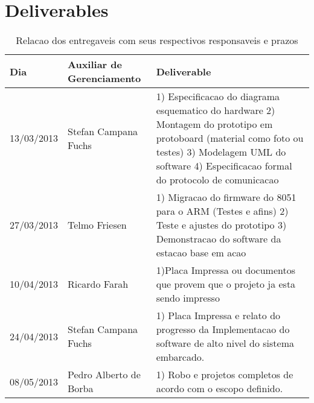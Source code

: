 \chapter{Deliverables}

\begin{table}[!h]
  \centering
  \caption{Relacao dos entregaveis com seus respectivos responsaveis e prazos}
    \begin{tabular}{|p{3cm}|p{4cm}||p{6cm}|}
    \toprule
    Dia   & Auxiliar de Gerenciamento & Deliverable \\
    \midrule
    13/03/2013 & Stefan Campana Fuchs & 1) Especificacao do diagrama esquematico do hardware
2) Montagem do prototipo em protoboard (material como foto ou testes)
3) Modelagem UML do software
4) Especificacao formal do protocolo de comunicacao  \\
    27/03/2013 & Telmo Friesen & 1) Migracao do firmware do 8051 para o ARM (Testes e afins)
2) Teste e ajustes do prototipo
3) Demonstracao do software da estacao base em acao  \\
    10/04/2013 & Ricardo Farah & 1)Placa Impressa ou documentos que provem que o projeto ja esta sendo impresso \\
    24/04/2013 & Stefan Campana Fuchs & 1) Placa Impressa e relato do progresso da Implementacao do software de alto nivel do sistema embarcado.  \\
    08/05/2013 & Pedro Alberto de Borba & 1) Robo e projetos completos de acordo com o escopo definido.  \\
    \bottomrule
    \end{tabular}%
  \label{tab:addlabel}%
\end{table}%
